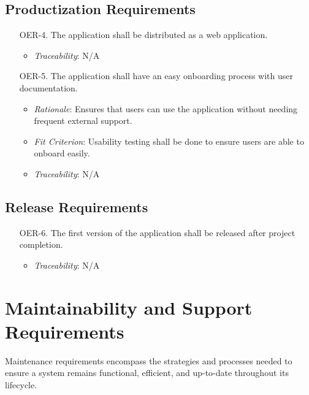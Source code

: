 \documentclass[12pt]{article}
\begin{document}
\subsection{Productization Requirements}
\begin{enumerate}
  \item[OER-4.] The application shall be distributed as a web application.
    \begin{itemize}
      \item \textit{Traceability}: N/A
    \end{itemize}
  \item[OER-5.] The application shall have an easy onboarding process with user documentation.
    \begin{itemize}
      \item \textit{Rationale}: Ensures that users can use the application without needing frequent external support.
      \item \textit{Fit Criterion}: Usability testing shall be done to ensure users are able to onboard easily.
      \item \textit{Traceability}: N/A
    \end{itemize}
\end{enumerate}

\subsection{Release Requirements}
\begin{enumerate}
  \item[OER-6.] The first version of the application shall be released after project completion.
    \begin{itemize}
      \item \textit{Traceability}: N/A
    \end{itemize}
\end{enumerate}

\section{Maintainability and Support Requirements}
Maintenance requirements encompass the strategies and processes needed to ensure
a system remains functional, efficient, and up-to-date throughout its lifecycle.
\end{document}
